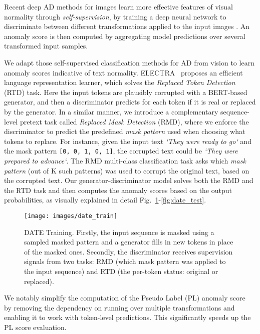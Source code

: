\documentclass[11pt]{article}
\begin{document}
Recent deep AD methods for images learn more effective features of visual normality through \emph{self-supervision}, by training a deep neural network to discriminate between different transformations applied to the input images \cite{Golan2018,neurips2019}. An anomaly score is then computed by aggregating model predictions over several transformed input samples.

We adapt those self-supervised classification methods for AD from vision to learn anomaly scores indicative of text normality. ELECTRA~\cite{Clark2020} proposes an efficient language representation learner, which solves the \emph{Replaced Token Detection} (RTD) task. Here the input tokens are plausibly corrupted with a BERT-based~\cite{Devlin2018} generator, and then a discriminator predicts for each token if it is real or replaced by the generator. In a similar manner, we introduce a complementary sequence-level pretext task called \emph{Replaced Mask Detection} (RMD), where we enforce the discriminator to predict the predefined \emph{mask pattern} used when choosing what tokens to replace. For instance, given the input text \emph{`They were ready to go`} and the mask pattern \texttt{[0, 0, 1, 0, 1]}, the corrupted text could be \emph{`They were prepared to advance`}. The RMD multi-class classification task asks which \emph{mask pattern} (out of K such patterns) was used to corrupt the original text, based on the corrupted text. Our generator-discriminator model solves both the RMD and the RTD task and then computes the anomaly scores based on the output probabilities, as visually explained in detail Fig.~\ref{fig:date_train}-\ref{fig:date_test}.


\begin{figure}[t!]
\centering
\texttt{[image: images/date\_train]}
\caption{DATE Training. Firstly, the input sequence is masked using a sampled masked pattern and a generator fills in new tokens in place of the masked ones. Secondly, the discriminator receives supervision signals from two tasks: RMD (which mask pattern was applied to the input sequence) and RTD (the per-token status: original or replaced).}
\label{fig:date_train}
\end{figure}


We notably simplify the computation of the Pseudo Label (PL) anomaly score~\cite{neurips2019} by removing the dependency on running over multiple transformations and enabling it to work with token-level predictions. This significantly speeds up the PL score evaluation.
\end{document}
